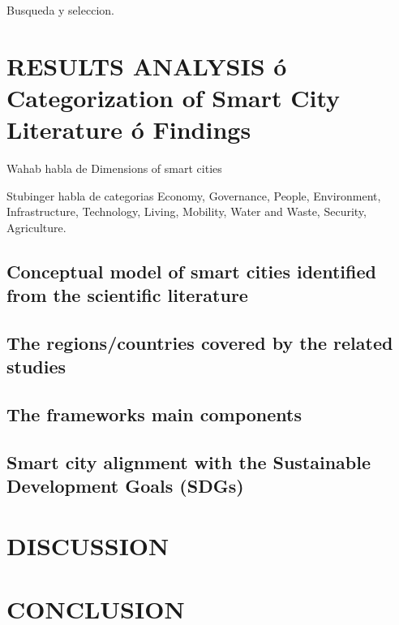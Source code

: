 \documentclass[a4paper,fleqn,spanish]{cas-dc}
\begin{document}
Busqueda y seleccion.


\section{RESULTS ANALYSIS ó Categorization of Smart City Literature ó Findings}\label{resultados}

Wahab habla de Dimensions of smart cities \cite{wahab_systematic_2020}

Stubinger habla de categorias \cite{stubinger_understanding_2020}
Economy,
Governance,
People,
Environment,
Infrastructure,
Technology,
Living,
Mobility,
Water and Waste,
Security, 
Agriculture.


\subsection{Conceptual model of smart cities identified from the scientific literature}\label{sci-lit}


\subsection{The regions/countries covered by the related studies}\label{regiones}



\subsection{The frameworks main components}\label{componentes}



\subsection{Smart city alignment with the Sustainable Development Goals (SDGs)}\label{sustentabilidad}


\section{DISCUSSION}\label{discusion}



\section{CONCLUSION}\label{conclucion}





%
%

%



%
\end{document}
